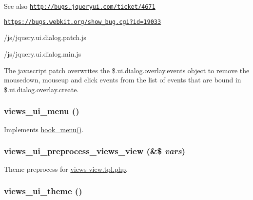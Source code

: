 \begin{DoxySeeAlso}{See also}
\href{http://bugs.jqueryui.com/ticket/4671}{\tt http://bugs.jqueryui.com/ticket/4671} 

\href{https://bugs.webkit.org/show_bug.cgi?id=19033}{\tt https://bugs.webkit.org/show\_\-bug.cgi?id=19033} 

/js/jquery.ui.dialog.patch.js 

/js/jquery.ui.dialog.min.js
\end{DoxySeeAlso}
The javascript patch overwrites the \$.ui.dialog.overlay.events object to remove the mousedown, mouseup and click events from the list of events that are bound in \$.ui.dialog.overlay.create. \hypertarget{views__ui_8module_add533a59614ea6c7758f4d428150f3a6}{
\subsubsection[{views\_\-ui\_\-menu}]{\setlength{\rightskip}{0pt plus 5cm}views\_\-ui\_\-menu ()}}
\label{views__ui_8module_add533a59614ea6c7758f4d428150f3a6}
Implements \hyperlink{group__hooks_ga5c95244fea59b25666e409759e133ded}{hook\_\-menu()}. \hypertarget{views__ui_8module_aa14dbf312575836186d709cdaea5856f}{
\subsubsection[{views\_\-ui\_\-preprocess\_\-views\_\-view}]{\setlength{\rightskip}{0pt plus 5cm}views\_\-ui\_\-preprocess\_\-views\_\-view (\&\$ {\em vars})}}
\label{views__ui_8module_aa14dbf312575836186d709cdaea5856f}
Theme preprocess for \hyperlink{views-view_8tpl_8php}{views-\/view.tpl.php}. \hypertarget{views__ui_8module_acf90ef9b70c0c8bf9300247b6325aedb}{
\subsubsection[{views\_\-ui\_\-theme}]{\setlength{\rightskip}{0pt plus 5cm}views\_\-ui\_\-theme ()}}
